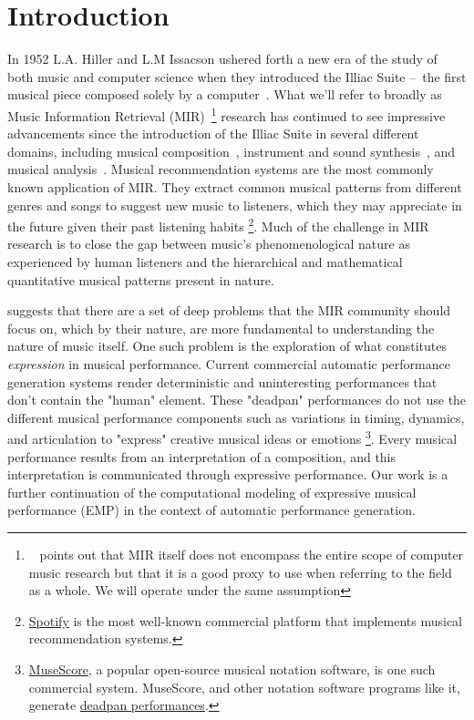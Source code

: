 \chapter{Introduction} \label{ch:ch1}

In 1952 L.A. Hiller and L.M Issacson ushered forth a new era of the study of both music and computer science when they introduced the Illiac Suite – the first musical piece composed solely by a computer~\cite{sandred2009revisiting}. What we'll refer to broadly as Music Information Retrieval (MIR)~\footnote{~\citet{widmer2016getting} points out that MIR itself does not encompass the entire scope of computer music research but that it is a good proxy to use when referring to the field as a whole. We will operate under the same assumption} research has continued to see impressive advancements since the introduction of the Illiac Suite in several different domains, including musical composition~\cite{briot2017deep}, instrument and sound synthesis~\cite{engel2017neural}, and musical analysis~\cite{widmer2016getting}. Musical recommendation systems are the most commonly known application of MIR. They extract common musical patterns from different genres and songs to suggest new music to listeners, which they may appreciate in the future given their past listening habits%
\footnote{\href{https://www.spotify.com/us/}{Spotify} is the most well-known commercial platform that implements musical recommendation systems.}. Much of the challenge in MIR research is to close the gap between music's phenomenological nature as experienced by human listeners and the hierarchical and mathematical quantitative musical patterns present in nature.

\citet{widmer2016getting} suggests that there are a set of deep problems that the MIR community should focus on, which by their nature, are more fundamental to understanding the nature of music itself. One such problem is the exploration of what constitutes \emph{expression} in musical performance. Current commercial automatic performance generation systems render deterministic and uninteresting performances that don't contain the "human" element. These "deadpan" performances do not use the different musical performance components such as variations in timing, dynamics, and articulation to "express" creative musical ideas or emotions%
\footnote{\href{https://musescore.org/en}{MuseScore}, a popular open-source musical notation software, is one such commercial system. MuseScore, and other notation software programs like it, generate \href{https://musescore.com/user/33884420/scores/6466906}{deadpan performances}.}. Every musical performance results from an interpretation of a composition, and this interpretation is communicated through expressive performance. Our work is a further continuation of the computational modeling of expressive musical performance (EMP) in the context of automatic performance generation. 

